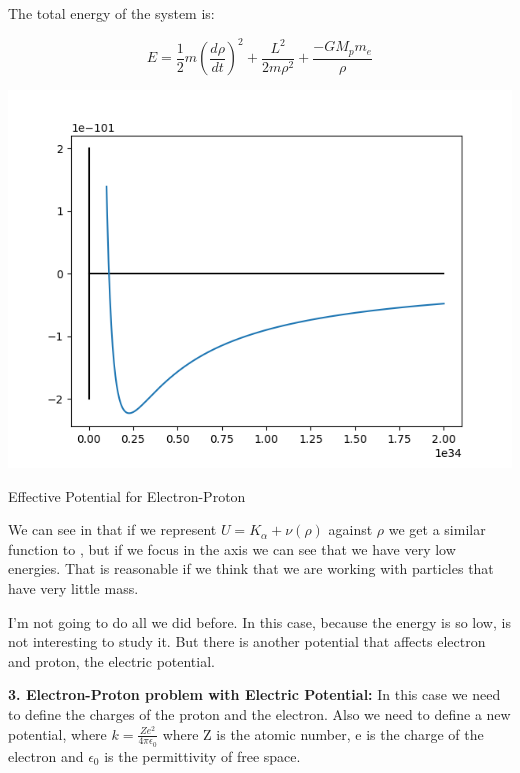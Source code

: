 The total energy of the system is:

\begin{equation}
\label{energy_E-P_mass}
    E = \frac{1}{2}m\left(\frac{d\rho}{dt}\right)^2+\frac{L^2}{2m\rho^2}+ \frac{ - G M_p m_e}{\rho} 
\end{equation}

\begin{marginfigure}
    \includegraphics{images/E-P_Potential_Well.png}
    \caption[Effective Potential for Electron-Proton]{Effective Potential for Electron-Proton}
\end{marginfigure}

We can see in  that if we represent $U = K_{\alpha}+\nu(\rho)$ against $\rho$ we get a similar function to , but if we focus in the axis we can see that we have very low energies. That is reasonable if we think that we are working with particles that have very little mass.

I'm not going to do all we did before. In this case, because the energy is so low, is not interesting to study it. But there is another potential that affects electron and proton, the electric potential.

\textbf{3. Electron-Proton problem with Electric Potential:} In this case we need to define the charges of the proton and the electron. Also we need to define a new potential, where $ k = \frac{Ze^2}{4\pi\epsilon_0} $ where Z is the atomic number, e is the charge of the electron   and $\epsilon_0$ is the permittivity of free space.

